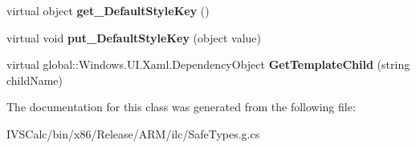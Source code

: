 \begin{DoxyCompactItemize}
\item 
\mbox{\label{class_windows_1_1_u_i_1_1_xaml_1_1_controls_1_1_control_a0f6b7d0a6e0dbad0ff65dd5861c20050}} 
virtual object {\bfseries get\+\_\+\+Default\+Style\+Key} ()
\item 
\mbox{\label{class_windows_1_1_u_i_1_1_xaml_1_1_controls_1_1_control_a6cc396f98c5876ae256d5b6d1c78ded9}} 
virtual void {\bfseries put\+\_\+\+Default\+Style\+Key} (object value)
\item 
\mbox{\label{class_windows_1_1_u_i_1_1_xaml_1_1_controls_1_1_control_ac603c14d7442a0aa06e00197591e9394}} 
virtual global\+::\+Windows.\+U\+I.\+Xaml.\+Dependency\+Object {\bfseries Get\+Template\+Child} (string child\+Name)
\end{DoxyCompactItemize}


The documentation for this class was generated from the following file\+:\begin{DoxyCompactItemize}
\item 
I\+V\+S\+Calc/bin/x86/\+Release/\+A\+R\+M/ilc/Safe\+Types.\+g.\+cs\end{DoxyCompactItemize}
